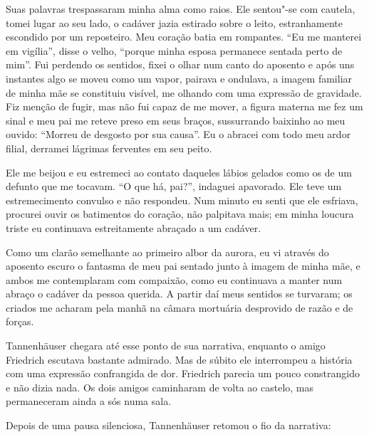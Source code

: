 Suas palavras trespassaram minha alma como raios. Ele sentou"-se com
cautela, tomei lugar ao seu lado, o cadáver jazia estirado sobre o
leito, estranhamente escondido por um reposteiro. Meu coração batia em
rompantes. ``Eu me manterei em vigília'', disse o velho, ``porque minha
esposa permanece sentada perto de mim''. Fui perdendo os sentidos, fixei
o olhar num canto do aposento e após uns instantes algo se moveu como
um vapor, pairava e ondulava, a imagem familiar de minha mãe se
constituiu visível, me olhando com uma expressão de gravidade. Fiz
menção de fugir, mas não fui capaz de me mover, a figura materna me fez
um sinal e meu pai me reteve preso em seus braços, sussurrando baixinho
ao meu ouvido: ``Morreu de desgosto por sua causa''. Eu o abracei com
todo meu ardor filial, derramei lágrimas ferventes em seu peito.

Ele me beijou e eu estremeci ao contato daqueles lábios gelados como os
de um defunto que me tocavam. ``O que há, pai?'', indaguei apavorado. Ele
teve um estremecimento convulso e não respondeu. Num minuto eu senti
que ele esfriava, procurei ouvir os batimentos do coração, não
palpitava mais; em minha loucura triste eu continuava estreitamente
abraçado a um cadáver.

Como um clarão semelhante ao primeiro albor da aurora, eu vi através do
aposento escuro o fantasma de meu pai sentado junto à imagem de minha
mãe, e \mbox{ambos} me contemplaram com compaixão, como eu continuava a manter
num abraço o cadáver da pessoa querida. A partir daí meus sentidos se
turvaram; os criados me acharam pela manhã na câmara mortuária
desprovido de razão e de forças.

Tannenhäuser chegara até esse ponto de sua narrativa, enquanto o
amigo Friedrich escutava bastante admirado. Mas de súbito ele
interrompeu a história com uma \mbox{expressão} confrangida de dor. Friedrich
parecia um pouco constrangido e não dizia nada. Os dois amigos
caminharam de volta ao castelo, mas permaneceram ainda a sós numa sala.

Depois de uma pausa silenciosa, Tannenhäuser retomou o fio da narrativa:


